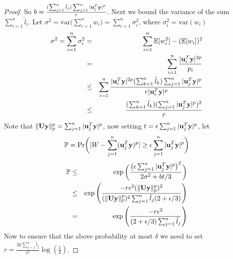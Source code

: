 \begin{proof}{\label{proof:onlineGuarantee}}
 So $b=\frac{(\sum_{j=1}^{n} \tilde{l}_{j})\sum_{j=1}^{n} |\mathbf{u}_{j}^{T}\mathbf{y}|^{p}}{r}$. Next we bound the variance of the sum $\sum_{i=1}^{n} \tilde{l}_{i}$. Let $\sigma^{2} = \mbox{var}\big(\sum_{i=1}^{n} w_{i}\big) = \sum_{i=1}^{n} \sigma_{i}^{2}$, where $\sigma_{i}^{2} = \mbox{var}(w_{i})$
 \begin{eqnarray}
  \sigma^{2} = \sum_{i=1}^{n} \sigma_{i}^{2} &=& \sum_{i=1}^{n} \mathbb{E}[w_{i}^{2}] - (\mathbb{E}[w_{i}])^{2} \nonumber \\
  &=& \sum_{i=1}^{n}\frac{|\mathbf{u}_{i}^{T}\mathbf{y}|^{2p}}{p_{i}} \nonumber \\
  &\leq& \sum_{i=1}^{n}\frac{|\mathbf{u}_{i}^{T}\mathbf{y}|^{2p}(\sum_{k=1}^{n} \tilde{l}_{k})\sum_{j=1}^{n} |\mathbf{u}_{j}^{T}\mathbf{y}|^{p}}{r|\mathbf{u}_{i}^{T}\mathbf{y}|^{p}} \nonumber \\
  &\leq& \frac{(\sum_{k=1}^{n} \tilde{l}_{k})(\sum_{j=1}^{n} |\mathbf{u}_{j}^{T}\mathbf{y}|^{p})^{2}}{r} \nonumber
 \end{eqnarray}
 Note that $\|\mathbf{U}\mathbf{y}\|_{p}^{p} = \sum_{j=1}^{n} |\mathbf{u}_{j}^{T}\mathbf{y}|^{p}$, now setting $t = \epsilon \sum_{j=1}^{n} |\mathbf{u}_{j}^{T}\mathbf{y}|^{p}$, let 
 $$\mathbb{P} = \mbox{Pr}\bigg(|W - \sum_{j=1}^{n} (\mathbf{u}_{j}^{T}\mathbf{y})^{p}| \geq \epsilon \sum_{j=1}^{n} |\mathbf{u}_{j}^{T}\mathbf{y}|^{p}\bigg)$$
 \begin{eqnarray}
  \mathbb{P} &\leq& \exp\bigg(\frac{\big(\epsilon \sum_{j=1}^{n} |\mathbf{u}_{j}^{T}\mathbf{y}|^{p}\big)^{2}}{2\sigma^{2}+bt/3}\bigg) \nonumber \\ 
  &\leq& \exp\Bigg(\frac{-r\epsilon^{2}(\|\mathbf{U}\mathbf{y}\|_{p}^{p})^{2}}{(\|\mathbf{U}\mathbf{y}\|_{p}^{p})^{2}\sum_{j=1}^{n}\tilde{l}_{j}(2+\epsilon/3)}\Bigg) \nonumber \\
  &=& \exp\Bigg(\frac{-r\epsilon^{2}}{(2+\epsilon/3)\sum_{j=1}^{n}\tilde{l}_{j}}\Bigg) \nonumber
 \end{eqnarray}
 Now to ensure that the above probability at most $\delta$ we need to set $r = \frac{2k\sum_{j=1}^{n}\tilde{l}_{j}} {\epsilon^{2}} \log(\frac 1 \delta)$.
 

\end{proof}
